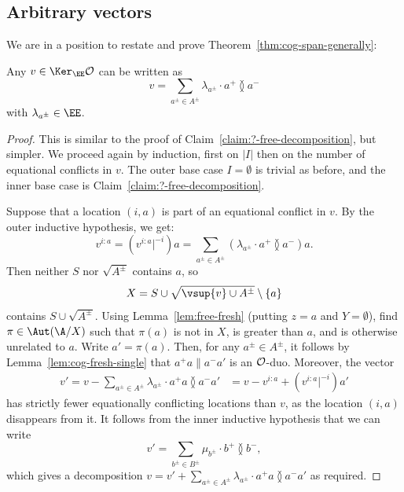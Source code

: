 \subsection{Arbitrary vectors}
We are in a position to restate and prove Theorem~\ref{thm:cog-span-generally}:
\begin{theorem}
    Any $v \in \Ker_\EE \cal O$ can be written as
    \[
        v = \sum_{a^\pm \in A^\pm} \lambda_{a^\pm} \cdot a^+ \between a^-
    \]
    with $\lambda_{a^\pm} \in \EE$.
\end{theorem}
\begin{proof}
This is similar to the proof of Claim~\ref{claim:?-free-decomposition}, but simpler.
We proceed again by induction, first on $|I|$ then on the number of equational conflicts in $v$.
The outer base case $I = \emptyset$ is trivial as before,  
and the inner base case is Claim~\ref{claim:?-free-decomposition}.

Suppose that a location $(i, a)$ is part of an equational conflict in $v$. 
By the outer inductive hypothesis, we get:
\[
    v^{i:a}
    = (v^{i:a}|^{-i}) a 
    = \sum_{a^\pm\in A^\pm} (\lambda_{a^\pm} \cdot a^+ \between a^-) a.
\]
Then neither $S$ nor $\sqrt{A^\pm}$ contains $a$,
so 
\[
    X = S \cup \sqrt{\vsup{v} \cup A^\pm} \setminus \{a\}
\]
contains $S \cup \sqrt{A^\pm}$.
Using Lemma~\ref{lem:free-fresh} (putting $z=a$ and $Y=\emptyset$), 
find $\pi \in \Aut(\A/X)$ such that $\pi(a)$ is not in $X$, is greater than $a$, and is otherwise unrelated to $a$. 
Write $a'=\pi(a)$. 
Then, for any $a^\pm \in A^\pm$, it follows by Lemma~\ref{lem:cog-fresh-single} that $a^+ a \parallel a^- a'$ is an $\cal O$-duo. 
Moreover, the vector
\begin{align*}
    v' = v - \sum_{a^\pm\in A^\pm} \lambda_{a^\pm} \cdot a^+ a \between a^- a'
    &= v -  v^{i:a} + (v^{i:a}|^{-i}) a' 
\end{align*}
has strictly fewer equationally conflicting locations than $v$, as the location $(i,a)$ disappears from it.
It follows from the inner inductive hypothesis that we can write
\[
    v' = \sum_{b^\pm \in B^\pm} \mu_{b^\pm} \cdot b^+ \between b^-,
\]
which gives a decomposition $v = v' + \sum_{a^\pm \in A^\pm} \lambda_{a^\pm} \cdot a^+ a \between a^- a'$ as required.
\end{proof}